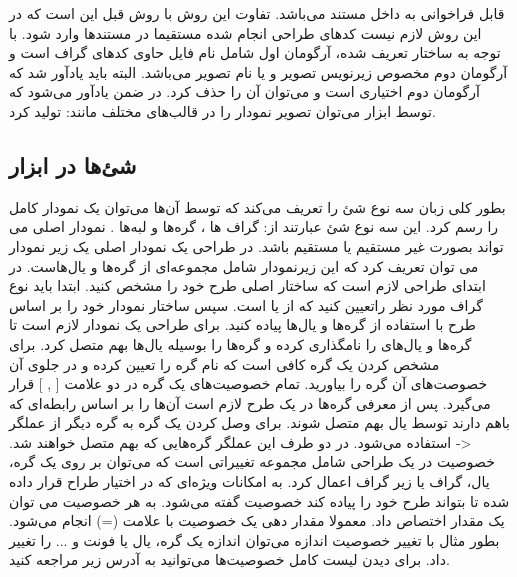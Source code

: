 قابل فراخوانی به داخل مستند می‌باشد. تفاوت این روش با روش قبل این است که در این روش لازم نیست کدهای طراحی انجام شده مستقیما در مستندها وارد شود. با توجه به ساختار تعریف شده، آرگومان اول شامل نام فایل حاوی کدهای گراف است و آرگومان دوم مخصوص زیرنویس تصویر و یا نام تصویر می‌باشد. البته باید یادآور شد که آرگومان دوم اختیاری است و می‌توان آن را حذف کرد.
در ضمن یادآور می‌شود که توسط ابزار  می‌توان تصویر نمودار را در قالب‌های مختلف مانند:
تولید کرد.
\subsection{شئ‌ها در ابزار }
بطور کلی زبان  سه نوع شئ را تعریف می‌کند که توسط آن‌ها می‌توان یک نمودار کامل را رسم کرد. این سه نوع شئ عبارتند از: گراف ها  ، گره‌ها  و لبه‌ها  . نمودار اصلی می تواند بصورت  غیر مستقیم یا  مستقیم باشد. در طراحی یک نمودار اصلی یک زیر نمودار  می توان تعریف کرد که این زیرنمودار شامل مجموعه‌ای از گره‌ها و یال‌هاست.
در ابتدای طراحی لازم است که ساختار اصلی طرح خود را مشخص کنید. ابتدا باید نوع گراف مورد نظر راتعیین کنید که از  یا  است. سپس ساختار نمودار خود را بر اساس طرح با استفاده از گره‌ها و یال‌ها پیاده کنید.
برای طراحی یک نمودار لازم است تا گره‌ها و یال‌های را نامگذاری کرده و گره‌ها را بوسیله یال‌ها بهم متصل کرد. برای مشخص کردن یک گره کافی است که نام گره را تعیین کرده و در جلوی آن خصوصت‌های آن گره را بیاورید. تمام خصوصیت‌های یک گره در دو علامت [ , ] قرار می‌گیرد. پس از معرفی گره‌ها در یک طرح لازم است آن‌ها را بر اساس رابطه‌ای که باهم دارند توسط یال بهم متصل شوند. برای وصل کردن یک گره به گره دیگر از عملگر {<-} استفاده می‌شود. در دو طرف این عملگر گره‌هایی که بهم متصل خواهند شد.
خصوصیت در یک طراحی شامل مجموعه تغییراتی است که می‌توان بر روی یک گره، یال،‌ گراف یا زیر گراف اعمال کرد. به امکانات ویژه‌ای که در اختیار طراح قرار داده شده تا بتواند طرح خود را پیاده کند خصوصیت گفته می‌شود. به هر خصوصیت می توان یک مقدار اختصاص داد. معمولا مقدار دهی یک خصوصیت با علامت (=) انجام می‌شود. بطور مثال با تغییر خصوصیت اندازه می‌‌توان اندازه یک گره، یال یا فونت و ... را تغییر داد. 
برای دیدن لیست کامل خصوصیت‌ها می‌توانید به آدرس زیر مراجعه کنید.%

